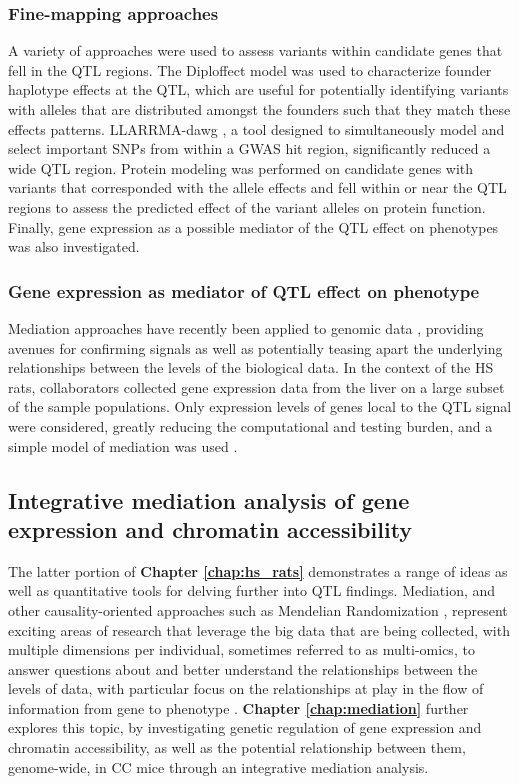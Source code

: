 \subsubsection{Fine-mapping approaches}

A variety of approaches were used to assess variants within candidate genes that fell in the QTL regions. The Diploffect model \citep{Zhang2014} was used to characterize founder haplotype effects at the QTL, which are useful for potentially identifying variants with alleles that are distributed amongst the founders such that they match these effects patterns. LLARRMA-dawg \citep{Sabourin2015}, a tool designed to simultaneously model and select important SNPs from within a GWAS hit region, significantly reduced a wide QTL region. Protein modeling \citep{Prokop2017} was performed on candidate genes with variants that corresponded with the allele effects and fell within or near the QTL regions to assess the predicted effect of the variant alleles on protein function. Finally, gene expression as a possible mediator of the QTL effect on phenotypes was also investigated.

\subsubsection{Gene expression as mediator of QTL effect on phenotype}

Mediation approaches have recently been applied to genomic data \citep{Battle2014,Chick2016,Roytman2018}, providing avenues for confirming signals as well as potentially teasing apart the underlying relationships between the levels of the biological data. In the context of the HS rats, collaborators collected gene expression data from the liver on a large subset of the sample populations. Only expression levels of genes local to the QTL signal were considered, greatly reducing the computational and testing burden, and a simple model of mediation was used \citep{Baron1986}.

\subsection{Integrative mediation analysis of gene expression and chromatin accessibility}

The latter portion of \textbf{Chapter \ref{chap:hs_rats}} demonstrates a range of ideas as well as quantitative tools for delving further into QTL findings. Mediation, and other causality-oriented approaches such as Mendelian Randomization \citep{Smith2003,Lawlor2008}, represent exciting areas of research that leverage the big data that are being collected, with multiple dimensions per individual, sometimes referred to as multi-omics, to answer questions about and better understand the relationships between the levels of data, with particular focus on the relationships at play in the flow of information from gene to phenotype \citep{Degner2012,Pai2015,Battle2015,Alasoo2017,Wu2018}. \textbf{Chapter \ref{chap:mediation}} further explores this topic, by investigating genetic regulation of gene expression and chromatin accessibility, as well as the potential relationship between them, genome-wide, in CC mice through an integrative mediation analysis.

